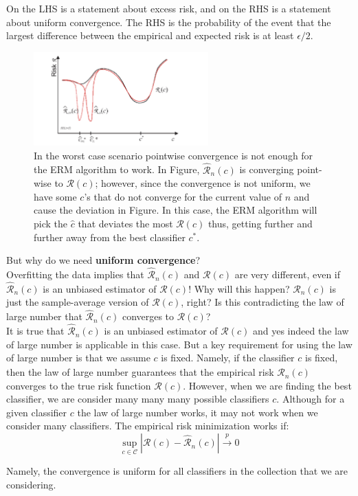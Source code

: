 \documentclass[twoside]{article}
\begin{document}
On the LHS is a statement about excess risk, and on the RHS is a statement about
uniform convergence. The RHS is the probability of the event that the largest difference
between the empirical and expected risk is at least $\epsilon/2$.
\begin{figure}[h]
\centering
\includegraphics[width=0.6\textwidth]{img/erm.png}
\caption{In the worst case scenario pointwise convergence is not enough for the ERM algorithm to work. In Figure, $\mathcal{\hat{R}}_{n}(c)$ is  converging point-wise to $\mathcal{R}(c)$; however, since the convergence is not uniform, we have some $c$'s that do not converge for the current value of $n$ and cause the deviation in Figure. In this case, the ERM algorithm will pick the $\hat{c}$ that deviates the most $\mathcal{R}(c)$  thus, getting further and further away from the best classifier $c^*$.}
\end{figure}

But why do we need \textbf{uniform convergence}?\\ 
Overfitting the data implies that $\mathcal{\hat{R}}_{n}(c)$ and $\mathcal{R}(c)$ are very different, even if $\mathcal{\hat{R}}_{n}(c)$ is an unbiased
estimator of $\mathcal{R}(c)$!
Why will this happen? $\mathcal{\hat{R}}_{n}(c)$ is just the sample-average version of $\mathcal{R}(c)$, right? Is this contradicting the law
of large number that $\mathcal{\hat{R}}_{n}(c)$ converges to $\mathcal{R}(c)$?\\
It is true that $\mathcal{\hat{R}}_{n}(c)$ is an unbiased estimator of $\mathcal{R}(c)$ and yes indeed the law of large number is applicable
in this case. But a key requirement for using the law of large number is that we assume $c$ is fixed. Namely,
if the classifier $c$ is fixed, then the law of large number guarantees that the empirical risk $\mathcal{\hat{R}}_{n}(c)$ converges
to the true risk function $\mathcal{R}(c)$.
However, when we are finding the best classifier, we are consider many many many possible classifiers $c$.
Although for a given classifier $c$ the law of large number works, it may not work when we consider many
classifiers. The empirical risk minimization works if:
$$\sup_{c \in \mathcal{C}}{|\mathcal{R}(c) - \mathcal{\hat{R}}_{n}(c)|}  \overset{p}{\to} 0$$

Namely, the convergence is uniform for all classifiers in the collection that we are considering.
\end{document}

